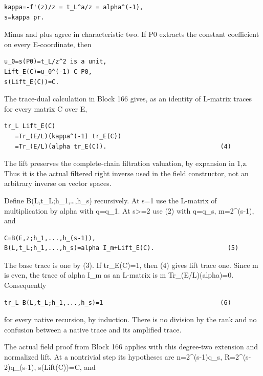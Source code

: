 \begin{Verbatim}[fontsize=\small,breaklines=true,breakanywhere=true]
kappa=-f'(z)/z = t_L^a/z = alpha^(-1),
s=kappa pr.
\end{Verbatim}

Minus and plus agree in characteristic two. If P0 extracts the constant
coefficient on every E-coordinate, then

\begin{Verbatim}[fontsize=\small,breaklines=true,breakanywhere=true]
u_0=s(P0)=t_L/z^2 is a unit,
Lift_E(C)=u_0^(-1) C P0,
s(Lift_E(C))=C.
\end{Verbatim}

The trace-dual calculation in Block 166 gives, as an identity of L-matrix
traces for every matrix C over E,

\begin{Verbatim}[fontsize=\small,breaklines=true,breakanywhere=true]
tr_L Lift_E(C)
   =Tr_(E/L)(kappa^(-1) tr_E(C))
   =Tr_(E/L)(alpha tr_E(C)).                               (4)
\end{Verbatim}

The lift preserves the complete-chain filtration valuation, by expansion
in 1,z. Thus it is the actual filtered right inverse used in the field
constructor, not an arbitrary inverse on vector spaces.

Define B(L,t\_L;h\_1,\ldots,h\_s) recursively. At s=1 use the L-matrix
of multiplication by alpha with q=q\_1. At s\textgreater=2 use (2) with
q=q\_s, m=2\^{}(s-1), and

\begin{Verbatim}[fontsize=\small,breaklines=true,breakanywhere=true]
C=B(E,z;h_1,...,h_(s-1)),
B(L,t_L;h_1,...,h_s)=alpha I_m+Lift_E(C).                    (5)
\end{Verbatim}

The base trace is one by (3). If tr\_E(C)=1, then (4) gives lift trace
one. Since m is even, the trace of alpha I\_m as an L-matrix is m
Tr\_(E/L)(alpha)=0. Consequently

\begin{Verbatim}[fontsize=\small,breaklines=true,breakanywhere=true]
tr_L B(L,t_L;h_1,...,h_s)=1                                (6)
\end{Verbatim}

for every native recursion, by induction. There is no division by the
rank and no confusion between a native trace and its amplified trace.

The actual field proof from Block 166 applies with this degree-two extension
and normalized lift. At a nontrivial step its hypotheses are
n=2\^{}(s-1)q\_s, R=2\^{}(s-2)q\_(s-1), s(Lift(C))=C, and

